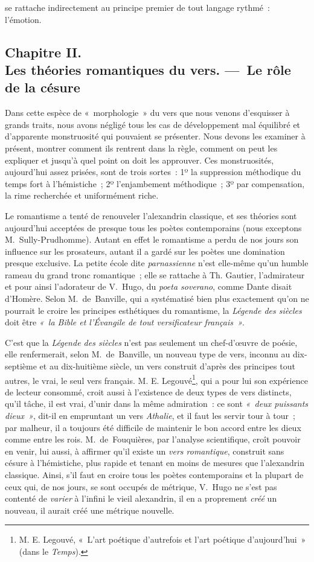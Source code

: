 \documentclass[french,twoside]{book} %
\begin{document}
se rattache indirectement au principe premier de tout langage rythmé : l’émotion.
\subsection[{Chapitre II. Les théories romantiques du vers. — Le rôle de la césure}]{Chapitre II. \\
Les théories romantiques du vers. — Le rôle de la césure}
\noindent  Dans cette espèce de « morphologie » du vers que nous venons d’esquisser à grands traits, nous avons négligé tous les cas de développement mal équilibré et d’apparente monstruosité qui pouvaient se présenter. Nous devons les examiner à présent, montrer comment ils rentrent dans la règle, comment on peut les expliquer et jusqu’à quel point on doit les approuver. Ces monstruosités, aujourd’hui assez prisées, sont de trois sortes : 1º la suppression méthodique du temps fort à l’hémistiche ; 2º l’enjambement méthodique ; 3º par compensation, la rime recherchée et uniformément riche.\par
Le romantisme a tenté de renouveler l’alexandrin classique, et ses théories sont aujourd’hui acceptées de presque tous les poètes contemporains (nous exceptons M. Sully-Prudhomme). Autant en effet le romantisme a perdu de nos jours son influence sur les prosateurs, autant il a gardé sur les poètes une domination presque exclusive. La petite école dite \emph{parnassienne} n’est elle-même qu’un  humble rameau du grand tronc romantique ; elle se rattache à Th. Gautier, l’admirateur et pour ainsi l’adorateur de V. Hugo, du \emph{\emph{poeta soverano}}, comme Dante disait d’Homère. Selon M. de Banville, qui a systématisé bien plus exactement qu’on ne pourrait le croire les principes esthétiques du romantisme, la \emph{Légende des siècles} doit être \emph{« la Bible et l’Évangile de tout versificateur français »}.\par
C’est que la \emph{Légende des siècles} n’est pas seulement un chef-d’œuvre de poésie, elle renfermerait, selon M. de Banville, un nouveau type de vers, inconnu au dix-septième et au dix-huitième siècle, un vers construit d’après des principes tout autres, le vrai, le seul vers français. Μ. E. Legouvé\footnote{Μ. E. Legouvé, « L’art poétique d’autrefois et l’art poétique d’aujourd’hui » (dans le \emph{Temps}).}, qui a pour lui son expérience de lecteur consommé, croit aussi à l’existence de deux types de vers distincts, qu’il tâche, il est vrai, d’unir dans la même admiration : ce sont \emph{« deux puissants dieux »}, dit-il en empruntant un vers \emph{Athalie}, et il faut les servir tour à tour ; par malheur, il a toujours été difficile de maintenir le bon accord entre les dieux comme entre les rois. M. de Fouquières, par l’analyse scientifique, croît pouvoir en venir, lui aussi, à affirmer qu’il existe un \emph{vers romantique}, construit sans césure à l’hémistiche, plus rapide et tenant en moins de mesures que l’alexandrin classique. Ainsi, s’il faut en croire tous les poètes contemporains et la plupart de ceux qui, de nos jours, se sont occupés de métrique, V. Hugo ne s’est pas contenté de \emph{varier} à l’infini  le vieil alexandrin, il en a proprement \emph{créé} un nouveau, il aurait créé une métrique nouvelle.\par
\end{document}
